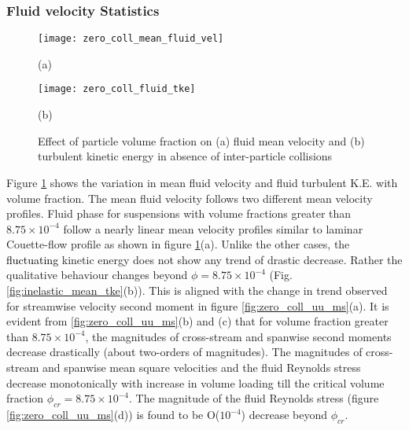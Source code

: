 \documentclass[aip,graphicx]{revtex4-1}
\begin{document}
\subsubsection{\textbf{Fluid velocity Statistics}}
 \begin{figure}[h!]
        	\texttt{[image: zero\_coll\_mean\_fluid\_vel]}
    	\caption*{(a)}
  	\texttt{[image: zero\_coll\_fluid\_tke]}
  	\caption*{(b)}
  	\caption{Effect of particle volume fraction on (a) fluid mean velocity and (b) turbulent kinetic energy in absence of inter-particle collisions}
  	\label{fig:zero_coll_mean_tke}
    \end{figure}
Figure \ref{fig:zero_coll_mean_tke} shows the variation in mean fluid velocity and fluid turbulent K.E. with volume fraction. The mean fluid velocity follows two different mean velocity profiles. Fluid phase for suspensions with volume fractions greater than $8.75\times10^{-4}$ follow a nearly linear mean velocity profiles similar to laminar Couette-flow profile as shown in figure \ref{fig:zero_coll_mean_tke}(a). Unlike the other cases, the \textcolor{black}{fluctuating} kinetic energy does not show any trend of drastic decrease. Rather the qualitative behaviour changes beyond $\phi=8.75\times10^{-4}$ (Fig.\ref{fig:inelastic_mean_tke}(b)). This is aligned with the change in trend observed for streamwise velocity second moment in figure \ref{fig:zero_coll_uu_ms}(a). It is evident from \ref{fig:zero_coll_uu_ms}(b) and (c) that for volume fraction greater than $8.75\times10^{-4}$, the magnitudes of cross-stream and spanwise second moments decrease drastically (about two-orders of magnitudes). The magnitudes of cross-stream and spanwise mean square velocities and the fluid Reynolds stress decrease monotonically with increase in volume loading till the critical volume fraction $\phi_{cr}=8.75\times10^{-4}$. The magnitude of the fluid Reynolds stress (figure \ref{fig:zero_coll_uu_ms}(d)) is found to be O($10^{-4}$) decrease beyond $\phi_{cr}$. 
\end{document}
